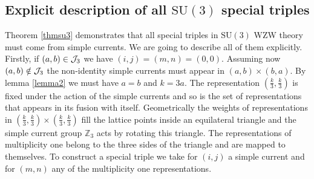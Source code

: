 \documentclass[a4paper,11pt]{article}
\theoremstyle{plain}
\theoremstyle{definition}
\begin{document}
\subsection{Explicit description of all $\mathrm{SU(3)}$ special triples}
Theorem \ref{thmsu3} demonstrates that all special triples in $\mathrm{SU(3)}$ WZW theory must come from simple currents. 
We are going to describe all of them explicitly. Firstly, if $(a,b)\in {\cal J}_{3}$ we have $(i,j)=(m,n)=(0,0)$.
Assuming now $(a,b)\notin {\cal J}_{3}$ the non-identity simple currents must appear in $(a,b)\times (b,a)$. By lemma \ref{lemma2} we must have
 $a=b$ and $k=3a$. The representation $(\frac{k}{3},\frac{k}{3})$ is  fixed under the action of the simple currents and so is the set of representations that appears in its fusion with itself. 
 Geometrically the weights of representations in $(\frac{k}{3},\frac{k}{3})\times (\frac{k}{3},\frac{k}{3})$ fill the lattice points inside an equilateral triangle and the simple current 
 group ${\mathbb Z}_{3}$ acts by rotating this triangle. The representations of multiplicity one belong to the three sides of the triangle and are mapped to themselves. 
 To construct a special triple we take for $(i,j)$ a simple current and for $(m,n)$ any of the multiplicity one representations. 

\end{document}
